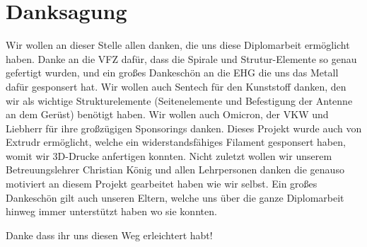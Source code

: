 \chapter*{Danksagung}
\label{chap:Danksagung}
Wir wollen an dieser Stelle allen danken, die uns diese Diplomarbeit ermöglicht haben. Danke an die VFZ dafür, dass die Spirale und Strutur-Elemente so genau gefertigt wurden, und ein großes Dankeschön an die EHG die uns das Metall dafür gesponsert hat. Wir wollen auch Sentech für den Kunststoff danken, den wir als wichtige Strukturelemente (Seitenelemente und Befestigung der Antenne an dem Gerüst) benötigt haben. Wir wollen auch Omicron, der VKW und Liebherr für ihre großzügigen Sponsorings danken. Dieses Projekt wurde auch von Extrudr ermöglicht, welche ein widerstandsfähiges Filament gesponsert haben, womit wir 3D-Drucke anfertigen konnten.
Nicht zuletzt wollen wir unserem Betreuungslehrer Christian König und allen Lehrpersonen danken die genauso motiviert an diesem Projekt gearbeitet haben wie wir selbst.
Ein großes Dankeschön gilt auch unseren Eltern, welche uns über die ganze Diplomarbeit hinweg immer unterstützt haben wo sie konnten.

Danke dass ihr uns diesen Weg erleichtert habt!
